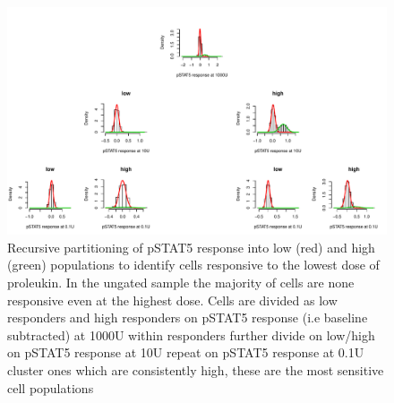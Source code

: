 \hspace{-2cm}
\begin{figure}[h]
\centering
\includegraphics[scale=.5]{figures/pstat5-rpart.pdf}
{ Recursive partitioning of pSTAT5 response into low (red) and high (green) populations to identify cells responsive to the lowest dose of proleukin. }
{
In the ungated sample the majority of cells are none responsive even at the highest dose.
Cells are divided as low responders and high responders on pSTAT5 response (i.e baseline subtracted) at 1000U 
within responders further divide on low/high on pSTAT5 response at 10U
repeat on pSTAT5 response at 0.1U
cluster ones which are consistently high, these are the most sensitive cell populations 
}
\end{figure}



